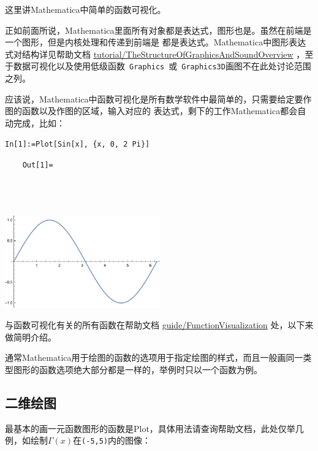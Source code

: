 \documentclass[UTF8,a4paper,10pt]{ctexart}
\begin{document}
这里讲Mathematica中简单的函数可视化。

正如前面所说，Mathematica里面所有对象都是表达式，图形也是。虽然在前端是一个图形，但是内核处理和传递到前端是
都是表达式。Mathematica中图形表达式对结构详见帮助文档
\href{http://reference.wolfram.com/language/tutorial/TheStructureOfGraphicsAndSoundOverview.html}{tutorial/TheStructureOfGraphicsAndSoundOverview}
，至于数据可视化以及使用低级函数~\verb|Graphics|~或~\verb|Graphics3D|画图不在此处讨论范围之列。

应该说，Mathematica中函数可视化是所有数学软件中最简单的，只需要给定要作图的函数以及作图的区域，输入对应的
表达式，剩下的工作Mathematica都会自动完成，比如：

\verb|In[1]:=Plot[Sin[x], {x, 0, 2 Pi}]|

\noindent
\begin{minipage}[b]{0.9cm}%
\verb|    Out[1]=|
\\\\\\\\%
\end{minipage}
\hfill
\begin{minipage}[b]{14.4cm}\ccwd
\includegraphics[height=4cm]{img/Sinx.pdf}
\end{minipage}

与函数可视化有关的所有函数在帮助文档
\href{http://reference.wolfram.com/language/guide/FunctionVisualization.html}{guide/FunctionVisualization}
处，以下来做简明介绍。

通常Mathematica用于绘图的函数的选项用于指定绘图的样式，而且一般画同一类型图形的函数选项绝大部分都是一样的，举例时只以一个函数为例。

\subsection{二维绘图}

最基本的画一元函数图形的函数是Plot，具体用法请查询帮助文档，此处仅举几例，如绘制$\Gamma(x)$在\verb|(-5,5)|内的图像：
\end{document}
